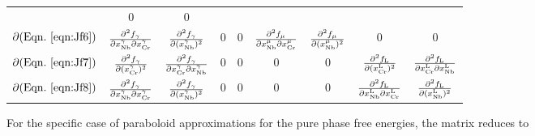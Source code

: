 \documentclass[10pt]{article}
\begin{document}
\begin{table}[ht]
\begin{small}
\begin{tabular}{|c|cccccccc|}
		& 0 & 0\\
		$\partial (\mathrm{Eqn.}~{\ref{eqn:Jf6}})$ & $\frac{\partial^2 f_{\gamma}}{\partial x_{\ce{Nb}}^{\gamma}\partial x_{\ce{Cr}}^{\gamma}}$ & $\frac{\partial^2 f_{\gamma}}{\partial(x_{\ce{Nb}}^{\gamma})^2}$
		& 0 & 0 & $\frac{\partial^2 f_{\mu}}{\partial x_{\ce{Nb}}^{\mu} \partial x_{\ce{Cr}}^{\mu}}$ & $\frac{\partial^2 f_{\mu}}{\partial(x_{\ce{Nb}}^{\mu})^2}$
		& 0 & 0\\
		$\partial (\mathrm{Eqn.}~{\ref{eqn:Jf7}})$ & $\frac{\partial^2 f_{\gamma}}{\partial(x_{\ce{Cr}}^{\gamma})^2}$ & $\frac{\partial^2 f_{\gamma}}{\partial x_{\ce{Cr}}^{\gamma}\partial x_{\ce{Nb}}^{\gamma}}$ 
		& 0 & 0 & 0 & 0 & $\frac{\partial^2 f_{\ce{L}}}{\partial(x_{\ce{Cr}}^{\ce{L}})^2}$ & $\frac{\partial^2 f_{\ce{L}}}{\partial x_{\ce{Cr}}^{\ce{L}}\partial x_{\ce{Nb}}^{\ce{L}}}$
		\\
		$\partial (\mathrm{Eqn.}~{\ref{eqn:Jf8}})$ & $\frac{\partial^2 f_{\gamma}}{\partial x_{\ce{Nb}}^{\gamma}\partial x_{\ce{Cr}}^{\gamma}}$ & $\frac{\partial^2 f_{\gamma}}{\partial(x_{\ce{Nb}}^{\gamma})^2}$
		& 0 & 0 & 0 & 0 & $\frac{\partial^2 f_{\ce{L}}}{\partial x_{\ce{Nb}}^{\ce{L}} \partial x_{\ce{Cr}}^{\ce{L}}}$ & $\frac{\partial^2 f_{\ce{L}}}{\partial(x_{\ce{Nb}}^{\ce{L}})^2}$
		\\\hline
		\end{tabular}
		\end{small}
		\end{table}

	For the specific case of paraboloid approximations for the pure phase free energies, the matrix reduces to
	
\end{document}
